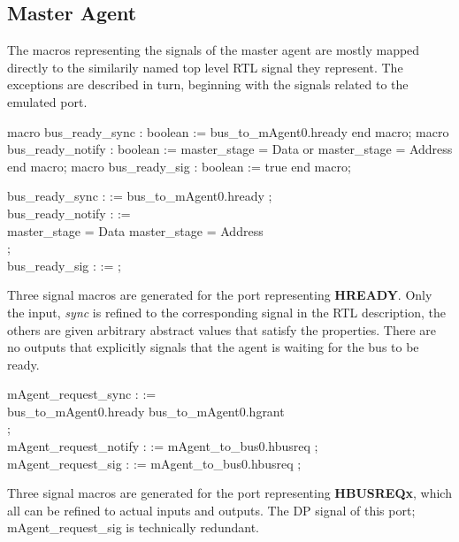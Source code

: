 \subsection{Master Agent}
The macros representing the signals of the master agent are mostly mapped directly to the similarily named top level RTL signal they represent. The exceptions are described in turn, beginning with the signals related to the emulated port. \par

\begin{VHI}
macro bus_ready_sync : boolean := bus_to_mAgent0.hready end macro; 
macro bus_ready_notify : boolean := 
master_stage = Data or master_stage = Address
end macro;
macro bus_ready_sig : boolean := true end macro; 
\end{VHI}

 bus\_ready\_sync :  := bus\_to\_mAgent0.hready ; \\
 bus\_ready\_notify :  := \\
master\_stage = Data  master\_stage = Address\\
;\\
 bus\_ready\_sig :  :=  ; \par

Three signal macros are generated for the port representing \textbf{HREADY}. Only the input, \textit{sync} is refined to the corresponding signal in the RTL description, the others are given arbitrary abstract values that satisfy the properties. There are no outputs that explicitly signals that the agent is waiting for the bus to be ready. \par

 mAgent\_request\_sync :  := \\
bus\_to\_mAgent0.hready  bus\_to\_mAgent0.hgrant \\
; \\
 mAgent\_request\_notify :  := mAgent\_to\_bus0.hbusreq ;\\
 mAgent\_request\_sig :  := mAgent\_to\_bus0.hbusreq ; \par

Three signal macros are generated for the port representing \textbf{HBUSREQx}, which all can be refined to actual inputs and outputs.  The DP signal of this port; mAgent\_request\_sig is technically redundant. \par 

